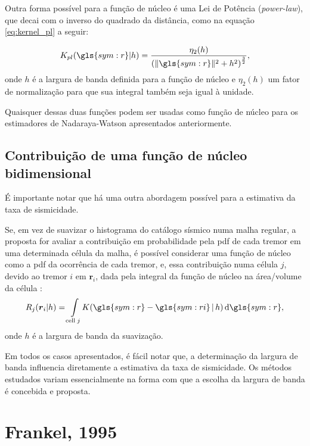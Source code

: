 Outra forma possível para a função de núcleo é uma Lei de Potência (\emph{power-law}), que decai com o 
inverso do quadrado da distância, como na equação
\eqref{eq:kernel_pl} a seguir:

\begin{equation}
	\ensuremath{
		K_{pl}(\gls{sym:r}\arrowvert h) = 
			\frac{\eta_2(h)}
 				 {\left( \|\gls{sym:r}\|^2 + h^2 \right)^{\frac{3}{2}} },
 	}
\label{eq:kernel_pl}
\end{equation}
onde $h$ é a largura de banda definida para a função de núcleo e $\eta_2(h)$ um fator de normalização
para que sua integral também seja igual à unidade.


Quaisquer dessas duas funções podem ser usadas como função de núcleo 
para os estimadores de Nadaraya-Watson apresentados anteriormente.

\subsection{Contribuição de uma função de núcleo bidimensional}

É importante notar que há uma outra abordagem possível para a estimativa da taxa de sismicidade.

Se, em vez de suavizar o histograma do catálogo sísmico numa malha regular, a proposta for
avaliar a contribuição em probabilidade pela \gls{pdf} de cada tremor em uma determinada célula da malha, 
é possível considerar uma função de núcleo como a \gls{pdf} da ocorrência de cada tremor, e,
essa contribuição numa célula $j$, devido ao tremor $i$ em $\boldsymbol{r}_i$, dada pela integral da
função de núcleo na área/volume da célula \citep{zechar_2010-2}: 
\begin{equation}
	\ensuremath{
		R_{j}(\boldsymbol{r}_i \arrowvert h) = \int\limits_{\mathrm{cell}\;j}\!K( \gls{sym:r} -
		\gls{sym:ri}\,\arrowvert\,h)\,\mathrm{d}\gls{sym:r} },
\label{eq:kernel_int}
\end{equation}
onde $h$ é a largura de banda da suavização.


Em todos os casos apresentados, é fácil notar que, a determinação da largura de banda influencia diretamente
a estimativa da taxa de sismicidade. Os métodos estudados variam essencialmente 
na forma com que a escolha da largura de banda é concebida e proposta.



\section{Frankel, 1995}
\label{sec:frankel}

